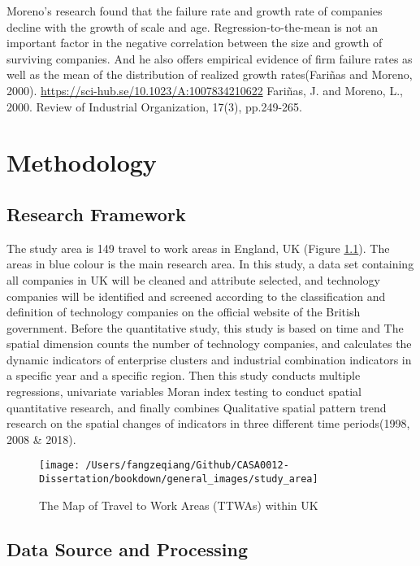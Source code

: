 \documentclass[
  12pt,
  oneside]{book}
\begin{document}
Moreno's research found that the failure rate and growth rate of companies decline with the growth of scale and age. Regression-to-the-mean is not an important factor in the negative correlation between the size and growth of surviving companies. And he also offers empirical evidence of firm failure rates as well as the mean of the distribution of realized growth rates(Fariñas and Moreno, 2000).
\url{https://sci-hub.se/10.1023/A:1007834210622}
Fariñas, J. and Moreno, L., 2000. Review of Industrial Organization, 17(3), pp.249-265.

\hypertarget{methodology}{%
\chapter{Methodology}\label{methodology}}

\hypertarget{research-framework}{%
\section{Research Framework}\label{research-framework}}

The study area is 149 travel to work areas in England, UK (Figure \ref{fig:fig-study-area}). The areas in blue colour is the main research area. In this study, a data set containing all companies in UK will be cleaned and attribute selected, and technology companies will be identified and screened according to the classification and definition of technology companies on the official website of the British government. Before the quantitative study, this study is based on time and The spatial dimension counts the number of technology companies, and calculates the dynamic indicators of enterprise clusters and industrial combination indicators in a specific year and a specific region. Then this study conducts multiple regressions, univariate variables Moran index testing to conduct spatial quantitative research, and finally combines Qualitative spatial pattern trend research on the spatial changes of indicators in three different time periods(1998, 2008 \& 2018).

\begin{figure}
\texttt{[image: /Users/fangzeqiang/Github/CASA0012-Dissertation/bookdown/general\_images/study\_area]} \caption{The Map of Travel to Work Areas (TTWAs) within UK}\label{fig:fig-study-area}
\end{figure}

\hypertarget{data-source-and-processing}{%
\section{Data Source and Processing}\label{data-source-and-processing}}
\end{document}
